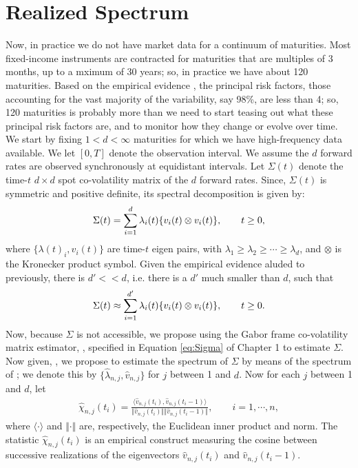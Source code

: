 \section{Realized Spectrum}
Now, in practice we do not have market data for a continuum of maturities. Most fixed-income instruments are contracted for maturities that are multiples of 3 months, up to a mximum of 30 years; so, in practice we have about 120 maturities. Based on the empirical evidence \citep{Bouchaud1999, Litterman1991}, the principal risk factors, those accounting for the vast majority of the variability, say 98\%, are less than 4; so, 120 maturities is probably more than we need to start teasing out what these principal risk factors are, and to monitor how they change or evolve over time. We start by 
fixing $1 < d < \infty$ maturities for which we have high-frequency data available. 
We let $[0,T]$ denote the observation interval. We assume the $d$ forward rates are observed synchronously at equidistant intervals.  Let $\Sigma(t)$ denote the time-$t$ $d \times d$ spot co-volatility matrix of the $d$ forward rates. Since, $\Sigma(t)$ is symmetric and positive definite, its spectral decomposition is given by:
\begin{align}
  \Sigma(t) = \sum_{i = 1}^d \lambda_i(t) \{v_i(t) \otimes v_i(t)\},\qquad t \ge 0,\notag
  \label{}
\end{align}
where  $\{\lambda(t)_i , v_i(t)\}$ are time-$t$ eigen pairs, with $\lambda_1 \ge \lambda_2 \ge \cdots \ge \lambda_d$,  and $\otimes$ is the Kronecker product symbol.   Given the empirical evidence aluded to previously, there is $d' << d$, i.e. there is a $d'$ much smaller than $d$,  
 such that  
\begin{align}
  \Sigma(t) \approx \sum_{i = 1}^{d'} \lambda_i(t) \{v_i(t) \otimes v_i(t)\},\qquad t \ge 0. \notag
  \label{}
\end{align}
Now, because $\Sigma$ is not accessible, we propose using  the Gabor frame co-volatility matrix estimator, \Svn,  specified in Equation \eqref{eq:Sigma} of Chapter 1 to estimate $\Sigma$. Now given, \Svn, we propose to estimate the spectrum of $\Sigma$ by means of the spectrum of \Svn;  we denote this by $\{\hat{\lambda}_{n,j}, \hat{v}_{n,j}\}$ for $j$ between 1 and $d$. 
Now for each $ j $ between 1 and $d$, let 
\begin{align}
  \hat{\chi}_{n,j} (t_i) = \frac{\langle \hat{v}_{n,j}(t_i),   \hat{v}_{n,j}(t_i -1)\rangle}{\Vert \hat{v}_{n,j}(t_i) \Vert \Vert \hat{v}_{n,j}(t_i -1) \Vert}, \qquad i = 1,\cdots,n,
\end{align}
where $\langle \cdot \rangle$ and $\Vert \cdot \Vert$ are, respectively, the Euclidean inner product and norm. The statistic $ \hat{\chi}_{n,j} (t_i)$ is an empirical construct measuring the cosine between successive realizations of the  eigenvectors $\hat{v}_{n,j}(t_i)$ and  $\hat{v}_{n,j}(t_i -1)$. 

